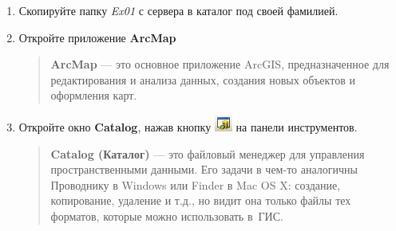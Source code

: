 \documentclass[]{book}
\theoremstyle{definition}
\theoremstyle{definition}
\theoremstyle{definition}
\theoremstyle{remark}
\begin{document}
\begin{enumerate}
\def\labelenumi{\arabic{enumi}.}
\item
  Скопируйте папку \emph{Ex01} с сервера в каталог под своей фамилией.
\item
  Откройте приложение \textbf{ArcMap}

  \begin{quote}
  \textbf{ArcMap} --- это основное приложение ArcGIS, предназначенное
  для редактирования и анализа данных, создания новых объектов и
  оформления карт.
  \end{quote}
\item
  Откройте окно \textbf{Catalog}, нажав кнопку
  \includegraphics{images/Ex01/image2.png} на панели инструментов.

  \begin{quote}
  \textbf{Catalog (Каталог)} --- это файловый менеджер для управления
  пространственными данными. Его задачи в чем-то аналогичны Проводнику в
  Windows или Finder в Mac OS X: создание, копирование, удаление и т.д.,
  но видит она только файлы тех форматов, которые можно использовать
  в~ГИС.
  \end{quote}


\end{enumerate}
\end{document}
